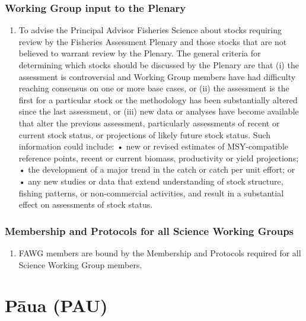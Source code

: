 \documentclass{mpi-plenary}
\providecommand{\tightlist}{%
  \setlength{\itemsep}{0pt}\setlength{\parskip}{0pt}}
\theoremstyle{definition}
\theoremstyle{definition}
\theoremstyle{definition}
\theoremstyle{remark}
\begin{document}
\subsection{Working Group input to the
Plenary}\label{working-group-input-to-the-plenary}

\begin{enumerate}
\def\labelenumi{\arabic{enumi}.}
\setcounter{enumi}{15}
\tightlist
\item
  To advise the Principal Advisor Fisheries Science about stocks
  requiring review by the Fisheries Assessment Plenary and those stocks
  that are not believed to warrant review by the Plenary. The general
  criteria for determining which stocks should be discussed by the
  Plenary are that (i) the assessment is controversial and Working Group
  members have had difficulty reaching consensus on one or more base
  cases, or (ii) the assessment is the first for a particular stock or
  the methodology has been substantially altered since the last
  assessment, or (iii) new data or analyses have become available that
  alter the previous assessment, particularly assessments of recent or
  current stock status, or projections of likely future stock status.
  Such information could include: • new or revised estimates of
  MSY-compatible reference points, recent or current biomass,
  productivity or yield projections; • the development of a major trend
  in the catch or catch per unit effort; or • any new studies or data
  that extend understanding of stock structure, fishing patterns, or
  non-commercial activities, and result in a substantial effect on
  assessments of stock status.
\end{enumerate}

\subsection{Membership and Protocols for all Science Working
Groups}\label{membership-and-protocols-for-all-science-working-groups}

\begin{enumerate}
\def\labelenumi{\arabic{enumi}.}
\setcounter{enumi}{16}
\tightlist
\item
  FAWG members are bound by the Membership and Protocols required for
  all Science Working Group members.
\end{enumerate}

\chapter{Pāua (PAU)}\label{paua-pau}
\end{document}
